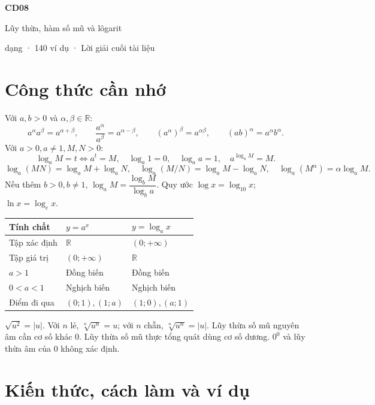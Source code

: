 \documentclass[11pt,a4paper]{article}
\begin{document}
{\Huge\sffamily\bfseries\color{teal} CD08\par}
{\LARGE\sffamily Lũy thừa, hàm số mũ và lôgarit\par}
 dạng · 140 ví dụ · Lời giải cuối tài liệu
{\small\tableofcontents}
\clearpage
\section{Công thức cần nhớ}
Với $a,b>0$ và $\alpha,\beta\in\mathbb R$:
\[
a^\alpha a^\beta=a^{\alpha+\beta},\qquad
\frac{a^\alpha}{a^\beta}=a^{\alpha-\beta},\qquad
(a^\alpha)^\beta=a^{\alpha\beta},\qquad
(ab)^\alpha=a^\alpha b^\alpha.
\]
Với $a>0,a\ne1,M,N>0$:
\[
\log_aM=t\iff a^t=M,\quad \log_a1=0,\quad\log_aa=1,
\quad a^{\log_aM}=M.
\]
\[
\log_a(MN)=\log_aM+\log_aN,\quad
\log_a(M/N)=\log_aM-\log_aN,\quad
\log_a(M^\alpha)=\alpha\log_aM.
\]
Nếu thêm $b>0,b\ne1$, $\log_aM=\dfrac{\log_bM}{\log_ba}$.
Quy ước $\log x=\log_{10}x$; $\ln x=\log_ex$.

\begin{center}\begin{tabular}{lll}\toprule
Tính chất & $y=a^x$ & $y=\log_ax$\\\midrule
Tập xác định & $\mathbb R$ & $(0;+\infty)$\\
Tập giá trị & $(0;+\infty)$ & $\mathbb R$\\
$a>1$ & Đồng biến & Đồng biến\\
$0<a<1$ & Nghịch biến & Nghịch biến\\
Điểm đi qua & $(0;1),(1;a)$ & $(1;0),(a;1)$\\\bottomrule
\end{tabular}\end{center}
\begin{tcolorbox}
$\sqrt{u^2}=|u|$. Với $n$ lẻ, $\sqrt[n]{u^n}=u$; với $n$ chẵn, $\sqrt[n]{u^n}=|u|$.
Lũy thừa số mũ nguyên âm cần cơ số khác 0. Lũy thừa số mũ thực tổng quát dùng cơ số dương.
$0^0$ và lũy thừa âm của 0 không xác định.
\end{tcolorbox}
\clearpage
\section{Kiến thức, cách làm và ví dụ}
\end{document}
